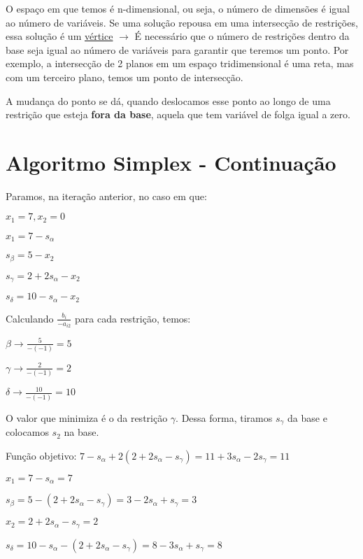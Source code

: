 O espaço em que temos é n-dimensional, ou seja, o número de dimensões é igual ao número de variáveis. Se uma solução repousa em uma intersecção de restrições, essa solução é um \underline{vértice} $\to$ É necessário que o número de restrições dentro da base seja igual ao número de variáveis para garantir que teremos um ponto. Por exemplo, a intersecção de 2 planos em um espaço tridimensional é uma reta, mas com um terceiro plano, temos um ponto de intersecção.

A mudança do ponto se dá, quando deslocamos esse ponto ao longo de uma restrição que esteja \textbf{fora da base}, aquela que tem variável de folga igual a zero.

\section{Algoritmo Simplex - Continuação}

Paramos, na iteração anterior, no caso em que:

\begin{example}
    $x_1 = 7, x_2 = 0$

    $x_1=7-s_\alpha$

    $s_\beta=5-x_2$

    $s_\gamma=2+2s_\alpha-x_2$

    $s_\delta=10-s_\alpha-x_2$
\end{example}

Calculando $\frac{b_i}{-a_{i2}}$ para cada restrição, temos:

\begin{example}
    $\beta \to \frac{5}{-(-1)} = 5$

    $\gamma\to\frac{2}{-(-1)} = 2$

    $\delta\to\frac{10}{-(-1)} = 10$
\end{example}

O valor que minimiza é o da restrição $\gamma$. Dessa forma, tiramos $s_\gamma$ da base e colocamos $s_2$ na base.

\begin{example}
    Função objetivo: $7 - s_\alpha+2(2+2s_\alpha-s_\gamma) = 11 + 3s_\alpha-2s_\gamma=11$
    
    $x_1 = 7-s_\alpha = 7$

    $s_\beta=5-(2+2s_\alpha-s_\gamma)=3-2s_\alpha+s_\gamma = 3$

    $x_2 = 2+2s_\alpha-s_\gamma=2$

    $s_\delta=10-s_\alpha-(2+2s_\alpha-s_\gamma)=8-3s_\alpha+s_\gamma=8$
\end{example}

